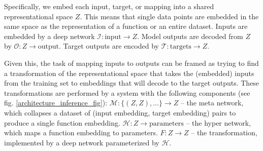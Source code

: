 \documentclass{article}
\begin{document}
Specifically, we embed each input, target, or mapping into a shared representational space $Z$. This means that single data points are embedded in the same space as the representation of a function or an entire dataset. Inputs are embedded by a deep network $\mathcal{I}: \text{input} \rightarrow Z$. Model outputs are decoded from $Z$ by $\mathcal{O}: Z \rightarrow \text{output}$. Target outputs are encoded by $\mathcal{T}: \text{targets} \rightarrow Z$.\par
Given this, the task of mapping inputs to outputs can be framed as trying to find a transformation of the representational space that takes the (embedded) inputs from the training set to embeddings that will decode to the target outputs. These transformations are performed by a system with the following components (see fig. \ref{architecture_inference_fig}): $\mathcal{M}: \{(Z, Z), ...\} \rightarrow Z $ -- the meta network, which collapses a dataset of (input embedding, target embedding) pairs to produce a single function embedding. $\mathcal{H}: Z \rightarrow \text{parameters}$ -- the hyper network, which maps a function embedding to parameters. $F: Z \rightarrow Z$ -- the transformation, implemented by a deep network parameterized by $\mathcal{H}$. \par
\vspace{-0.5em}
\end{document}
